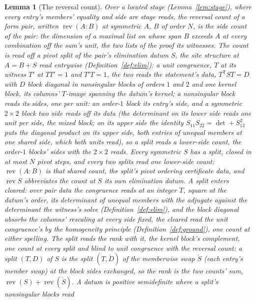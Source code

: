 \documentclass[11pt]{article}
\newtheorem{lemma}{Lemma}
\theoremstyle{definition}
\begin{document}
\begin{lemma}[The reversal count]\label{lem:inertia}
Over a located stage (Lemma~\ref{lem:stage}), where every entry's
members' equality and side are stage reads, the \emph{reversal count} of a
form pair, written $\operatorname{rev}(A\!:\!B)$ at symmetric $A$,
$B$ of order $N$, is the side count of the pair: the dimension of
a maximal list on whose span $B$ exceeds $A$ at every combination off
the sum's unit, the two lists of the proof its witnesses. The count is
read off a \emph{pivot split} of the
pair's elimination datum $S$, the site structure at
$A=B+S$ read entrywise (Definition~\ref{def:elim}): a \emph{unit
congruence}, $T$ at its witness $T'$ at $TT'=1$ and $T'T=1$, the
two reads the statement's data,
$T^{\mathsf T}ST=D$ with $D$ block diagonal in nonsingular blocks of
orders $1$ and $2$ and one \emph{kernel block}, its columns' $T$-image
spanning the datum's kernel; a nonsingular block reads its
\emph{sides}, one per unit: an order-$1$ block its entry's side, and
a symmetric $2\times2$ block two side reads off its data (the
determinant on its lower side reads one unit per side, the
\emph{mixed} block; on its upper side the identity
$S_{11}S_{22}=\det+S_{12}^{2}$ puts the
diagonal product on its upper side, both entries of unequal members at
one shared side, which both units read), so a split reads a
lower-side count,
the order-$1$ blocks' sides with the $2\times2$ reads. Every
symmetric $S$ has a split, closed in at most $N$ pivot steps, and
every two splits read one lower-side count:
$\operatorname{rev}(A\!:\!B)$ is that shared count, the split's
pivot ordering certificate data, and $\operatorname{rev}S$
abbreviates the count at $S$ its own elimination datum. A split
enters cleared: over pair data the congruence reads at an integer
$T$, square at the datum's order, its determinant of unequal
members with the adjugate against the determinant the witness's
solve (Definition~\ref{def:elim}), and the block diagonal absorbs
the columns' rescaling at every side fixed, the cleared read the
unit congruence's by the homogeneity principle
(Definition~\ref{def:ground}), one count at either spelling. The split
reads the \emph{rank}
with it, the kernel block's complement, one count at every split and
blind to unit congruence with the reversal count: a split
$(T,D)$ of $S$ is the split $(T,\check D)$ of the memberwise swap
$\check S$ (each entry's member swap) at the block
sides exchanged, so the rank is the two counts' sum,
$\operatorname{rev}(S)+\operatorname{rev}(\check S)$. A datum is
\emph{positive semidefinite} where a split's nonsingular blocks read

\end{lemma}
\end{document}
